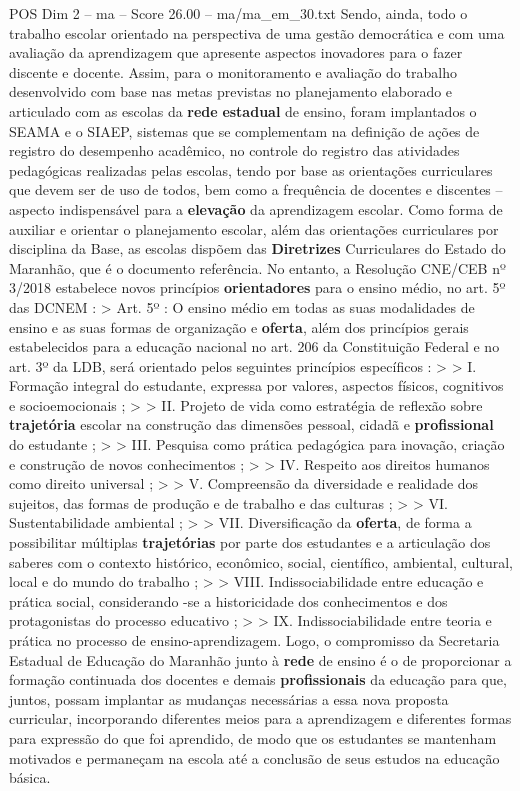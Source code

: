 \begin{textsample}{POS Dim 2 – ma – Score 26.00 – ma/ma\_em\_30.txt}
Sendo, ainda, todo o trabalho escolar orientado na perspectiva de uma gestão democrática e com uma avaliação da aprendizagem que apresente aspectos inovadores para o fazer discente e docente.
Assim, para o monitoramento e avaliação do trabalho desenvolvido com base nas metas previstas no planejamento elaborado e articulado com as escolas da \textbf{rede} \textbf{estadual} de ensino, foram implantados o SEAMA e o SIAEP, sistemas que se complementam na definição de ações de registro do desempenho acadêmico, no controle do registro das atividades pedagógicas realizadas pelas escolas, tendo por base as orientações curriculares que devem ser de uso de todos, bem como a frequência de docentes e discentes – aspecto indispensável para a \textbf{elevação} da aprendizagem escolar.
Como forma de auxiliar e orientar o planejamento escolar, além das orientações curriculares por disciplina da Base, as escolas dispõem das \textbf{Diretrizes} Curriculares do Estado do Maranhão, que é o documento referência.
No entanto, a Resolução CNE/CEB nº 3/2018 estabelece novos princípios \textbf{orientadores} para o ensino médio, no art. 5º das DCNEM : > Art. 5º : O ensino médio em todas as suas modalidades de ensino e as suas formas de organização e \textbf{oferta}, além dos princípios gerais estabelecidos para a educação nacional no art. 206 da Constituição Federal e no art. 3º da LDB, será orientado pelos seguintes princípios específicos : > > I.
Formação integral do estudante, expressa por valores, aspectos físicos, cognitivos e socioemocionais ; > > II.
Projeto de vida como estratégia de reflexão sobre \textbf{trajetória} escolar na construção das dimensões pessoal, cidadã e \textbf{profissional} do estudante ; > > III.
Pesquisa como prática pedagógica para inovação, criação e construção de novos conhecimentos ; > > IV.
Respeito aos direitos humanos como direito universal ; > > V.
Compreensão da diversidade e realidade dos sujeitos, das formas de produção e de trabalho e das culturas ; > > VI.
Sustentabilidade ambiental ; > > VII.
Diversificação da \textbf{oferta}, de forma a possibilitar múltiplas \textbf{trajetórias} por parte dos estudantes e a articulação dos saberes com o contexto histórico, econômico, social, científico, ambiental, cultural, local e do mundo do trabalho ; > > VIII.
Indissociabilidade entre educação e prática social, considerando -se a historicidade dos conhecimentos e dos protagonistas do processo educativo ; > > IX.
Indissociabilidade entre teoria e prática no processo de ensino-aprendizagem.
Logo, o compromisso da Secretaria Estadual de Educação do Maranhão junto à \textbf{rede} de ensino é o de proporcionar a formação continuada dos docentes e demais \textbf{profissionais} da educação para que, juntos, possam implantar as mudanças necessárias a essa nova proposta curricular, incorporando diferentes meios para a aprendizagem e diferentes formas para expressão do que foi aprendido, de modo que os estudantes se mantenham motivados e permaneçam na escola até a conclusão de seus estudos na educação básica.

\end{textsample}
